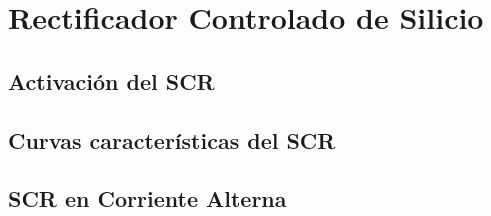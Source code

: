 \chapter{Rectificador Controlado de Silicio}

  \section{Activación del SCR}

  \section{Curvas características del SCR}

  \section{SCR en Corriente Alterna}

